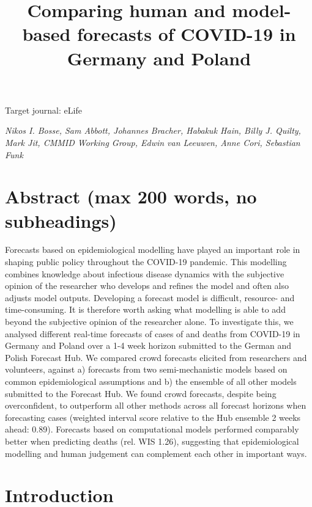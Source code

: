 \documentclass[
]{article}
\title{Comparing human and model-based forecasts of COVID-19 in Germany and Poland}
\author{}
\date{\vspace{-2.5em}}
\begin{document}
\maketitle

Target journal: eLife

\emph{Nikos I. Bosse, Sam Abbott, Johannes Bracher, Habakuk Hain, Billy J. Quilty, Mark Jit, CMMID Working Group, Edwin van Leeuwen, Anne Cori, Sebastian Funk}

\hypertarget{abstract-max-200-words-no-subheadings}{%
\section{Abstract (max 200 words, no subheadings)}\label{abstract-max-200-words-no-subheadings}}

Forecasts based on epidemiological modelling have played an important role in shaping public policy throughout the COVID-19 pandemic. This modelling combines knowledge about infectious disease dynamics with the subjective opinion of the researcher who develops and refines the model and often also adjusts model outputs. Developing a forecast model is difficult, resource- and time-consuming. It is therefore worth asking what modelling is able to add beyond the subjective opinion of the researcher alone. To investigate this, we analysed different real-time forecasts of cases of and deaths from COVID-19 in Germany and Poland over a 1-4 week horizon submitted to the German and Polish Forecast Hub. We compared crowd forecasts elicited from researchers and volunteers, against a) forecasts from two semi-mechanistic models based on common epidemiological assumptions and b) the ensemble of all other models submitted to the Forecast Hub. We found crowd forecasts, despite being overconfident, to outperform all other methods across all forecast horizons when forecasting cases (weighted interval score relative to the Hub ensemble 2 weeks ahead: 0.89). Forecasts based on computational models performed comparably better when predicting deaths (rel. WIS 1.26), suggesting that epidemiological modelling and human judgement can complement each other in important ways.

\hypertarget{introduction}{%
\section{Introduction}\label{introduction}}
\end{document}
